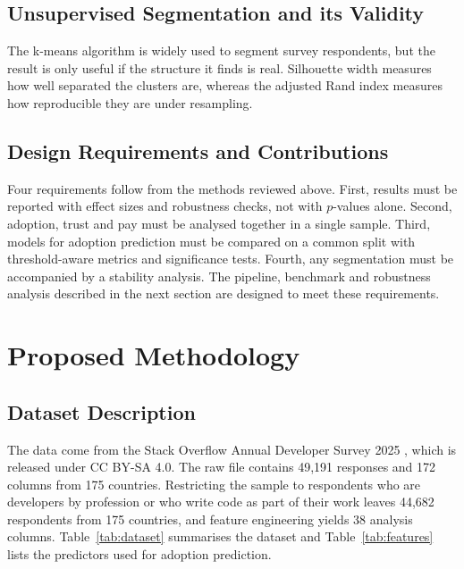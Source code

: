 \documentclass[conference]{IEEEtran}
\begin{document}
\subsection{Unsupervised Segmentation and its Validity}
The k-means algorithm \cite{macqueen1967} is widely used to segment survey respondents, but the result is only useful if the structure it finds is real. Silhouette width \cite{rousseeuw1987} measures how well separated the clusters are, whereas the adjusted Rand index \cite{hubert1985} measures how reproducible they are under resampling.

\subsection{Design Requirements and Contributions}
Four requirements follow from the methods reviewed above. First, results must be reported with effect sizes and robustness checks, not with $p$-values alone. Second, adoption, trust and pay must be analysed together in a single sample. Third, models for adoption prediction must be compared on a common split with threshold-aware metrics and significance tests. Fourth, any segmentation must be accompanied by a stability analysis. The pipeline, benchmark and robustness analysis described in the next section are designed to meet these requirements.

\section{Proposed Methodology}

\subsection{Dataset Description}
The data come from the Stack Overflow Annual Developer Survey 2025 \cite{so2025}, which is released under CC BY-SA 4.0. The raw file contains 49{,}191 responses and 172 columns from 175 countries. Restricting the sample to respondents who are developers by profession or who write code as part of their work leaves 44{,}682 respondents from 175 countries, and feature engineering yields 38 analysis columns. Table~\ref{tab:dataset} summarises the dataset and Table~\ref{tab:features} lists the predictors used for adoption prediction.
\end{document}
